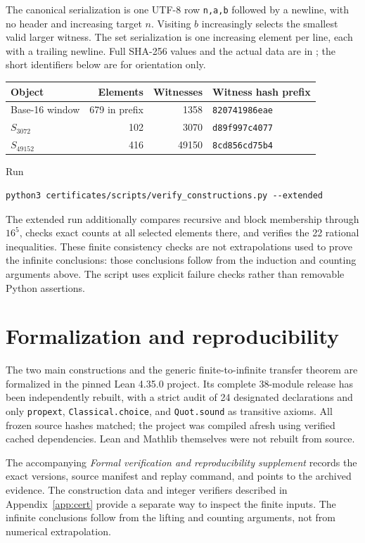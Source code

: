 \documentclass[11pt]{article}
\theoremstyle{definition}\newtheorem{definition}[theorem]{Definition}
\theoremstyle{remark}\newtheorem{remark}[theorem]{Remark}
\numberwithin{equation}{section}
\begin{document}
The canonical serialization is one UTF-8 row \texttt{n,a,b} followed by a newline, with no header and increasing target $n$. Visiting $b$ increasingly selects the smallest valid larger witness. The set serialization is one increasing element per line, each with a trailing newline. Full SHA-256 values and the actual data are in ; the short identifiers below are for orientation only.
\begin{center}\small
\begin{tabular}{lrrl}
\toprule
Object & Elements & Witnesses & Witness hash prefix\\
\midrule
Base-16 window & 679 in prefix & 1358 & \texttt{820741986eae}\\
$S_{3072}$ & 102 & 3070 & \texttt{d89f997c4077}\\
$S_{49152}$ & 416 & 49150 & \texttt{8cd856cd75b4}\\
\bottomrule
\end{tabular}
\end{center}
Run
\begin{lstlisting}
python3 certificates/scripts/verify_constructions.py --extended
\end{lstlisting}
The extended run additionally compares recursive and block membership through $16^5$, checks exact counts at all selected elements there, and verifies the 22 rational inequalities. These finite consistency checks are not extrapolations used to prove the infinite conclusions: those conclusions follow from the induction and counting arguments above. The script uses explicit failure checks rather than removable Python assertions.

\section{Formalization and reproducibility}\label{app:lean}
The two main constructions and the generic finite-to-infinite transfer theorem
are formalized in the pinned Lean 4.35.0 project. Its complete 38-module release
has been independently rebuilt, with a strict audit of 24 designated
declarations and only \texttt{propext}, \texttt{Classical.choice}, and
\texttt{Quot.sound} as transitive axioms. All frozen source hashes matched;
the project was compiled afresh using verified cached dependencies. Lean and
Mathlib themselves were not rebuilt from source.

The accompanying \emph{Formal verification and reproducibility supplement}
records the exact versions, source manifest and replay command, and points to
the archived evidence.
The construction data and integer verifiers described in Appendix~\ref{app:cert}
provide a separate way to inspect the finite inputs. The infinite conclusions
follow from the lifting and counting arguments, not from numerical extrapolation.
\end{document}
